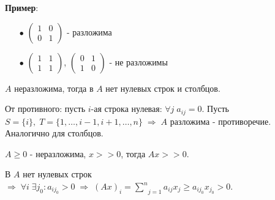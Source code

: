 \textbf{Пример}:
\begin{itemize}
	\item[$\bullet$]
		$\begin{pmatrix}
		1 & 0 \\
		0 & 1
	\end{pmatrix}$ - разложима
	\item[$\bullet$]
		$\begin{pmatrix}
		1 & 1 \\
		1 & 1
	\end{pmatrix}$, $\begin{pmatrix}
		0 & 1 \\
		1 & 0
	\end{pmatrix}$ - не разложимы
\end{itemize}

\begin{clair}[]\label{cha:7/clair:1}
	$A$ неразложима, тогда в $A$ нет нулевых строк и столбцов.
\end{clair}
\begin{Proof}
	От противного: пусть $i$-ая строка нулевая: $\forall j \; a_{ij} = 0$. Пусть $S = \{i\}, \; T = \{1, \dots, i-1, i+1, \dots, n\} \; \Rightarrow \; A$ разложима - противоречие. Аналогично для столбцов.
\end{Proof}

\begin{clair}[]\label{cha:7/clair:2}
	$A \ge 0 $ - неразложима, $x >> 0$, тогда $A x >> 0$.
\end{clair}
\begin{Proof}
	В $A$ нет нулевых строк $\Rightarrow \; \forall i \; \exists j_0: a_{i j_0} > 0 \; \Rightarrow \; (A x)_i = \underset{j=1}{\overset{n}{\sum}}a_{ij}x_j \ge a_{i j_0} x_{j_0} > 0$.
\end{Proof}

